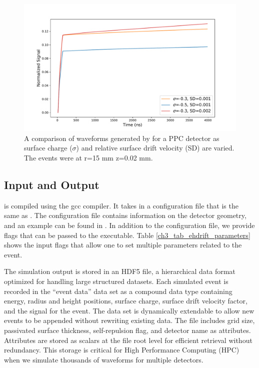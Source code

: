 \begin{figure}%
    \includegraphics[trim={0.1cm 0.3cm 1.3cm 0.3cm},clip,width=0.99\linewidth]{ch3/figs/wf_comp.pdf}
    \caption{A comparison of waveforms generated by {\ehd} for a {\Ltwo} PPC detector as surface charge ($\sigma$) and relative surface drift velocity (SD) are varied. The events were at r=15 mm z=0.02 mm.}
    \label{fig:wf_comp}
\end{figure}


\subsection{Input and Output}
{\ehd} is compiled using the gcc compiler. It takes in a configuration file that is the same as {\siggen}. The configuration file contains information on the detector geometry, and an example can be found in \cite{ehdrift2024}. In addition to the configuration file, we provide flags that can be passed to the executable. Table \ref{ch3_tab_ehdrift_parameters} shows the input flags that allow one to set multiple parameters related to the event.



The simulation output is stored in an HDF5 file, a hierarchical data format optimized for handling large structured datasets. Each simulated event is recorded in the ``event data'' data set as a compound data type containing energy, radius and height positions, surface charge, surface drift velocity factor, and the signal for the event. The data set is dynamically extendable to allow new events to be appended without rewriting existing data. The file includes grid size, passivated surface thickness, self-repulsion flag, and detector name as attributes. Attributes are stored as scalars at the file root level for efficient retrieval without redundancy. This storage is critical for High Performance Computing (HPC) when we simulate thousands of waveforms for multiple detectors.


